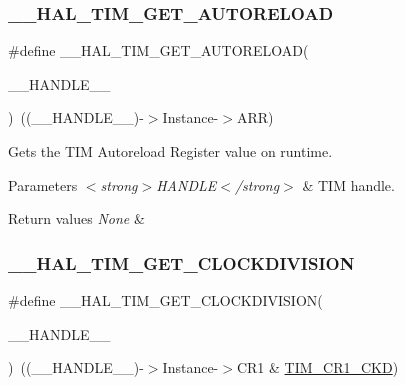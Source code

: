 \subsubsection{\texorpdfstring{\+\_\+\+\_\+\+H\+A\+L\+\_\+\+T\+I\+M\+\_\+\+G\+E\+T\+\_\+\+A\+U\+T\+O\+R\+E\+L\+O\+AD}{\_\_HAL\_TIM\_GET\_AUTORELOAD}}
{\footnotesize\ttfamily \#define \+\_\+\+\_\+\+H\+A\+L\+\_\+\+T\+I\+M\+\_\+\+G\+E\+T\+\_\+\+A\+U\+T\+O\+R\+E\+L\+O\+AD(\begin{DoxyParamCaption}\item[{}]{\+\_\+\+\_\+\+H\+A\+N\+D\+L\+E\+\_\+\+\_\+ }\end{DoxyParamCaption})~((\+\_\+\+\_\+\+H\+A\+N\+D\+L\+E\+\_\+\+\_\+)-\/$>$Instance-\/$>$A\+RR)}



Gets the T\+IM Autoreload Register value on runtime. 


\begin{DoxyParams}{Parameters}
{\em $<$strong$>$\+H\+A\+N\+D\+L\+E$<$/strong$>$} & T\+IM handle. \\
\hline
\end{DoxyParams}

\begin{DoxyRetVals}{Return values}
{\em None} & \\
\hline
\end{DoxyRetVals}
\mbox{\label{group___t_i_m___exported___macros_gae6bc91bb5940bce52828c690f24001b8}} 
\subsubsection{\texorpdfstring{\+\_\+\+\_\+\+H\+A\+L\+\_\+\+T\+I\+M\+\_\+\+G\+E\+T\+\_\+\+C\+L\+O\+C\+K\+D\+I\+V\+I\+S\+I\+ON}{\_\_HAL\_TIM\_GET\_CLOCKDIVISION}}
{\footnotesize\ttfamily \#define \+\_\+\+\_\+\+H\+A\+L\+\_\+\+T\+I\+M\+\_\+\+G\+E\+T\+\_\+\+C\+L\+O\+C\+K\+D\+I\+V\+I\+S\+I\+ON(\begin{DoxyParamCaption}\item[{}]{\+\_\+\+\_\+\+H\+A\+N\+D\+L\+E\+\_\+\+\_\+ }\end{DoxyParamCaption})~((\+\_\+\+\_\+\+H\+A\+N\+D\+L\+E\+\_\+\+\_\+)-\/$>$Instance-\/$>$C\+R1 \& \hyperlink{group___peripheral___registers___bits___definition_gacacc4ff7e5b75fd2e4e6b672ccd33a72}{T\+I\+M\+\_\+\+C\+R1\+\_\+\+C\+KD})}



